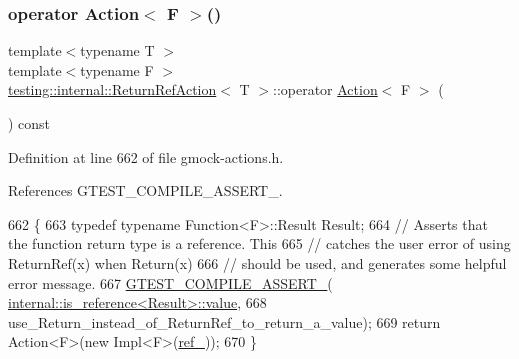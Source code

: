\mbox{\label{classtesting_1_1internal_1_1ReturnRefAction_a48e5d411097707e558af62eb68edc162}} 
\subsubsection{\texorpdfstring{operator Action$<$ F $>$()}{operator Action< F >()}}
{\footnotesize\ttfamily template$<$typename T $>$ \\
template$<$typename F $>$ \\
\hyperlink{classtesting_1_1internal_1_1ReturnRefAction}{testing\+::internal\+::\+Return\+Ref\+Action}$<$ T $>$\+::operator \hyperlink{classtesting_1_1Action}{Action}$<$ F $>$ (\begin{DoxyParamCaption}{ }\end{DoxyParamCaption}) const\hspace{0.3cm}{\ttfamily [inline]}}



Definition at line 662 of file gmock-\/actions.\+h.



References G\+T\+E\+S\+T\+\_\+\+C\+O\+M\+P\+I\+L\+E\+\_\+\+A\+S\+S\+E\+R\+T\+\_\+.


\begin{DoxyCode}
662                              \{
663     \textcolor{keyword}{typedef} \textcolor{keyword}{typename} Function<F>::Result Result;
664     \textcolor{comment}{// Asserts that the function return type is a reference.  This}
665     \textcolor{comment}{// catches the user error of using ReturnRef(x) when Return(x)}
666     \textcolor{comment}{// should be used, and generates some helpful error message.}
667     \hyperlink{gtest-port_8h_ae1f37dc71d5daa6fb49ca1b6047d4a8c}{GTEST\_COMPILE\_ASSERT\_}(
      \hyperlink{structtesting_1_1internal_1_1bool__constant_a499fba6576296b04d99690a486424b32}{internal::is\_reference<Result>::value},
668                           use\_Return\_instead\_of\_ReturnRef\_to\_return\_a\_value);
669     \textcolor{keywordflow}{return} Action<F>(\textcolor{keyword}{new} Impl<F>(\hyperlink{classtesting_1_1internal_1_1ReturnRefAction_ad63d08b72518c2059e0cc99c006cd620}{ref\_}));
670   \}
\end{DoxyCode}


